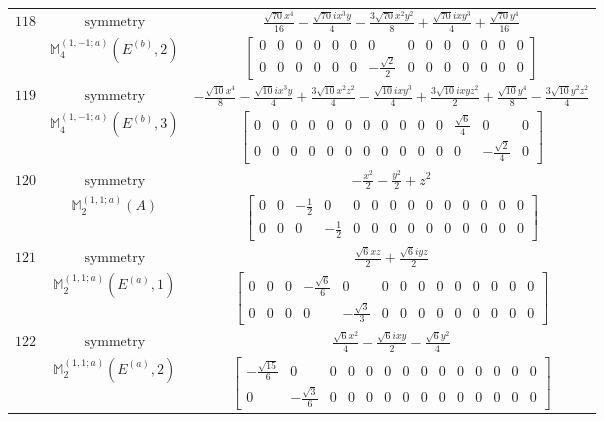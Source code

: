 \documentclass[fleqn,8pt,landscape]{jsarticle}
\begin{document}
\begin{longtable}{ccc}
$ 118 $ & $ \text{symmetry} $ & $ \frac{\sqrt{70} x^{4}}{16} - \frac{\sqrt{70} i x^{3} y}{4} - \frac{3 \sqrt{70} x^{2} y^{2}}{8} + \frac{\sqrt{70} i x y^{3}}{4} + \frac{\sqrt{70} y^{4}}{16} $ \\
$  $ & $ \mathbb{M}_{4}^{(1,-1;a)}(E^{(b)},2) $ & $ \begin{bmatrix} 0 & 0 & 0 & 0 & 0 & 0 & 0 & 0 & 0 & 0 & 0 & 0 & 0 & 0 \\ 0 & 0 & 0 & 0 & 0 & 0 & - \frac{\sqrt{2}}{2} & 0 & 0 & 0 & 0 & 0 & 0 & 0 \end{bmatrix} $ \\ \hline
$ 119 $ & $ \text{symmetry} $ & $ - \frac{\sqrt{10} x^{4}}{8} - \frac{\sqrt{10} i x^{3} y}{4} + \frac{3 \sqrt{10} x^{2} z^{2}}{4} - \frac{\sqrt{10} i x y^{3}}{4} + \frac{3 \sqrt{10} i x y z^{2}}{2} + \frac{\sqrt{10} y^{4}}{8} - \frac{3 \sqrt{10} y^{2} z^{2}}{4} $ \\
$  $ & $ \mathbb{M}_{4}^{(1,-1;a)}(E^{(b)},3) $ & $ \begin{bmatrix} 0 & 0 & 0 & 0 & 0 & 0 & 0 & 0 & 0 & 0 & 0 & \frac{\sqrt{6}}{4} & 0 & 0 \\ 0 & 0 & 0 & 0 & 0 & 0 & 0 & 0 & 0 & 0 & 0 & 0 & - \frac{\sqrt{2}}{4} & 0 \end{bmatrix} $ \\ \hline
$ 120 $ & $ \text{symmetry} $ & $ - \frac{x^{2}}{2} - \frac{y^{2}}{2} + z^{2} $ \\
$  $ & $ \mathbb{M}_{2}^{(1,1;a)}(A) $ & $ \begin{bmatrix} 0 & 0 & - \frac{1}{2} & 0 & 0 & 0 & 0 & 0 & 0 & 0 & 0 & 0 & 0 & 0 \\ 0 & 0 & 0 & - \frac{1}{2} & 0 & 0 & 0 & 0 & 0 & 0 & 0 & 0 & 0 & 0 \end{bmatrix} $ \\ \hline
$ 121 $ & $ \text{symmetry} $ & $ \frac{\sqrt{6} x z}{2} + \frac{\sqrt{6} i y z}{2} $ \\
$  $ & $ \mathbb{M}_{2}^{(1,1;a)}(E^{(a)},1) $ & $ \begin{bmatrix} 0 & 0 & 0 & - \frac{\sqrt{6}}{6} & 0 & 0 & 0 & 0 & 0 & 0 & 0 & 0 & 0 & 0 \\ 0 & 0 & 0 & 0 & - \frac{\sqrt{3}}{3} & 0 & 0 & 0 & 0 & 0 & 0 & 0 & 0 & 0 \end{bmatrix} $ \\ \hline
$ 122 $ & $ \text{symmetry} $ & $ \frac{\sqrt{6} x^{2}}{4} - \frac{\sqrt{6} i x y}{2} - \frac{\sqrt{6} y^{2}}{4} $ \\
$  $ & $ \mathbb{M}_{2}^{(1,1;a)}(E^{(a)},2) $ & $ \begin{bmatrix} - \frac{\sqrt{15}}{6} & 0 & 0 & 0 & 0 & 0 & 0 & 0 & 0 & 0 & 0 & 0 & 0 & 0 \\ 0 & - \frac{\sqrt{3}}{6} & 0 & 0 & 0 & 0 & 0 & 0 & 0 & 0 & 0 & 0 & 0 & 0 \end{bmatrix} $ \\ \hline

\end{longtable}
\end{document}

